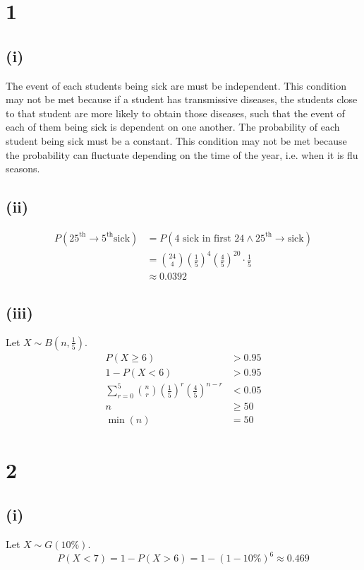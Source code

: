 \documentclass[a4paper]{article}
\begin{document}
\section*{1}
\subsection*{(i)}
The event of each students being sick are must be independent. This condition may not be met because if a student has transmissive diseases, the students close to that student are more likely to obtain those diseases, such that the event of each of them being sick is dependent on one another.
The probability of each student being sick must be a constant. This condition may not be met because the probability can fluctuate depending on the time of the year, i.e. when it is flu seasons.

\subsection*{(ii)}
\[\begin{aligned}
	P\left(25^\text{th}\to5^\text{th}\text{sick}\right)
	&=P\left(4\text{ sick in first }24\land25^\text{th}\to\text{sick}\right)\\
	&=\binom{24}4{\left(\frac15\right)}^4{\left(\frac45\right)}^{20}\cdot\frac15\\
	&\approx\boxed{0.0392}
\end{aligned}\]

\subsection*{(iii)}
Let \(X\sim B\left(n,\frac15\right)\).
\[\begin{aligned}
	P(X\geqslant6)&>0.95\\
	1-P(X<6)&>0.95\\
	\sum\limits_{r=0}^5\binom nr{\left(\frac15\right)}^r{\left(\frac45\right)}^{n-r}&<0.05\\
	n&\geqslant50\\
	\min(n)&=\boxed{50}
\end{aligned}\]

\section*{2}
\subsection*{(i)}
Let \(X\sim G(10\%)\).
\[P(X<7)=1-P(X>6)=1-(1-10\%)^6\approx\boxed{0.469}\]
\end{document}
